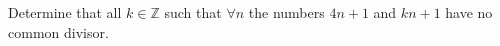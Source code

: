 Determine that all $ k \in \mathbb{Z}$ such that $ \forall n$ the numbers $ 4n+1$ and $ kn+1$ have no common divisor.